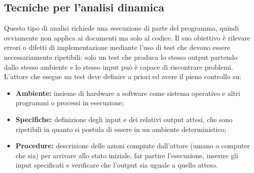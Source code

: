 \documentclass[a4paper]{report}
\begin{document}
			\subsection{Tecniche per l'analisi dinamica}
				Questo tipo di analisi richiede una esecuzione di parte del programma, quindi ovviamente non applica 
				ai documenti ma solo al codice. Il suo obiettivo è rilevare errori o difetti di implementazione 
				mediante l'uso di test che devono essere necessariamente ripetibili: solo un test che produca lo 
				stesso output partendo dallo stesso ambiente e lo stesso input può è capace di riscontrare problemi. 
				L'attore che esegue un test deve definire a priori ed avere il pieno controllo su:
				\begin{itemize}
					\item \textbf{Ambiente:} insieme di hardware a software come sistema operativo e altri programmi o 
					processi in esecuzione;
					\item \textbf{Specifiche:} definizione degli input e dei relativi output attesi, che sono ripetibili 
					in quanto si postula di essere in un ambiente deterministico;
					\item \textbf{Procedure:} descrizione delle azioni compiute dall'attore (umano o computer che sia) 
					per arrivare allo stato iniziale, far partire l'esecuzione, inserire gli input specificati e verificare 
					che l'output sia uguale a quello atteso.
				\end{itemize}
				
\end{document}
